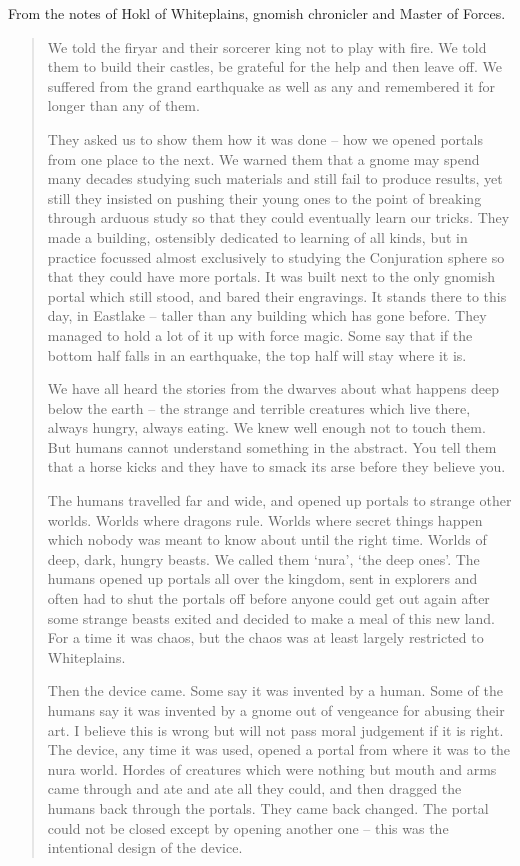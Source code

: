 \begin{multicols}{2}
\label{r_hunter}

From the notes of Hokl of Whiteplains, gnomish chronicler and Master of Forces.

\begin{quotation}

	We told the firyar and their sorcerer king not to play with fire.
	We told them to build their castles, be grateful for the help and then leave off.
	We suffered from the grand earthquake as well as any and remembered it for longer than any of them.  

	They asked us to show them how it was done -- how we opened portals from one place to the next.
	We warned them that a gnome may spend many decades studying such materials and still fail to produce results, yet still they insisted on pushing their young ones to the point of breaking through arduous study so that they could eventually learn our tricks.
	They made a building, ostensibly dedicated to learning of all kinds, but in practice focussed almost exclusively to studying the Conjuration sphere so that they could have more portals.
	It was built next to the only gnomish portal which still stood, and bared their engravings.
	It stands there to this day, in Eastlake -- taller than any building which has gone before.
	They managed to hold a lot of it up with force magic.
	Some say that if the bottom half falls in an earthquake, the top half will stay where it is.

	We have all heard the stories from the dwarves about what happens deep below the earth -- the strange and terrible creatures which live there, always hungry, always eating.
	We knew well enough not to touch them.
	But humans cannot understand something in the abstract.
	You tell them that a horse kicks and they have to smack its arse before they believe you.

	The humans travelled far and wide, and opened up portals to strange other worlds.
	Worlds where dragons rule.
	Worlds where secret things happen which nobody was meant to know about until the right time.
	Worlds of deep, dark, hungry beasts.
	We called them `nura', `the deep ones'.
	The humans opened up portals all over the kingdom, sent in explorers and often had to shut the portals off before anyone could get out again after some strange beasts exited and decided to make a meal of this new land.
	For a time it was chaos, but the chaos was at least largely restricted to Whiteplains.

	Then the device came.
	Some say it was invented by a human.
	Some of the humans say it was invented by a gnome out of vengeance for abusing their art.
	I believe this is wrong but will not pass moral judgement if it is right.
	The device, any time it was used, opened a portal from where it was to the nura world.
	Hordes of creatures which were nothing but mouth and arms came through and ate and ate all they could, and then dragged the humans back through the portals.
	They came back changed.
	The portal could not be closed except by opening another one -- this was the intentional design of the device.


\end{quotation}
\end{multicols}
